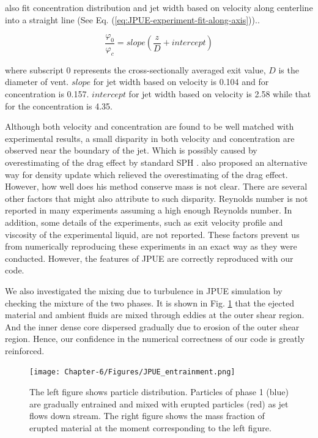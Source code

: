 \citet{papanicolaou1988investigations} also fit concentration distribution and jet width based on velocity along centerline into a straight line (See Eq. (\ref{eq:JPUE-experiment-fit-along-axis})).. 

\begin{equation}
\dfrac{\varphi_0}{\varphi_c}=slope \left(\dfrac{z}{D} + intercept \right)
\label{eq:JPUE-experiment-fit-along-axis}
\end{equation}

where subscript $0$ represents the cross-sectionally averaged exit value, $D$ is the diameter of vent. 
$slope$ for jet width based on velocity is 0.104 and for concentration is 0.157. 
$intercept$ for jet width based on velocity is 2.58 while that for the concentration is 4.35.

Although both velocity and concentration are found to be well matched with experimental results, a small disparity in both velocity and concentration are observed near the boundary of the jet. Which is possibly caused by overestimating of the drag effect by standard SPH \citep {ritchie2001multiphase}. \citet {ritchie2001multiphase} also proposed an alternative way for density update which relieved the overestimating of the drag effect. However, how well does his method conserve mass is not clear. There are several other factors that might also attribute to such disparity. Reynolds number is not reported in many experiments assuming a high enough Reynolds number. In addition, some details of the experiments, such as exit velocity profile and viscosity of the experimental liquid, are not reported. These factors prevent us from numerically reproducing these experiments in an exact way as they were conducted. However, the features of JPUE are correctly reproduced with our code.

We also investigated the mixing due to turbulence in JPUE simulation by checking the mixture of the two phases. It is shown in Fig. \ref{fig:Turb_mixing} that the ejected material and ambient fluids are mixed through eddies at the outer shear region. And the inner dense core dispersed gradually due to erosion of the outer shear region. Hence, our confidence in the numerical correctness of our code is greatly reinforced.

\begin{figure}
\centering
\texttt{[image: Chapter-6/Figures/JPUE\_entrainment.png]}
\caption{The left figure shows particle distribution. Particles of phase 1 (blue) are gradually entrained and mixed with erupted particles (red) as jet flows down stream. The right figure shows the mass fraction of erupted material at the moment corresponding to the left figure.}
\label{fig:Turb_mixing}
\end{figure}

